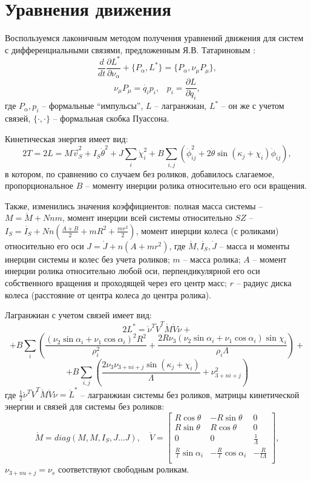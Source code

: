 \section{Уравнения движения}

Воспользуемся лаконичным методом получения уравнений движения для систем с дифференциальными связями, предложенным Я.В. Татариновым \cite{Tatarinov}:
\begin{equation}\label{Tatarinov}
    \frac{d}{dt}\frac{\partial L^{*}}{\partial \nu_\alpha}  + \{P_\alpha, L^{*}\} = \{P_\alpha, \nu_\mu P_\mu\}, 
\end{equation}
$$\nu_\mu P_\mu = \dot{q_i} p_i, \hspace{10pt} p_i = \frac{\partial L}{\partial \dot{q}_i},$$
где $P_\alpha, p_i$ -- формальные ``импульсы'', $L$ -- лагранжиан, $L^*$ -- он же с учетом связей, $\{\cdot, \cdot\}$ -- формальная скобка Пуассона.

Кинетическая энергия имеет вид:
\begin{equation}\label{kin_en}
    2T = 2L = M\vec{v}_S^2 + I_S\dot{\theta}^2 + J\sum_i\dot{\chi}_i^2 + B\sum_{i,j}(\dot{\phi}_{ij}^2 + 2\dot{\theta}\sin(\kappa_j + \chi_i)\dot{\phi}_{ij}),
\end{equation}
в котором, по сравнению со случаем без роликов, добавилось слагаемое, пропорциональное $B$ -- моменту инерции ролика относительно его оси вращения.

Также, изменились значения коэффициентов: полная масса системы -- $M = \mathring{M} + Nnm$, момент инерции всей системы относительно $SZ$ -- $I_S = \mathring{I_S} + Nn(\frac{A+B}{2} + mR^2 + \frac{mr^2}{2})$, момент инерции колеса (с роликами) относительно его оси $J = \mathring{J} + n(A + mr^2)$, где $\mathring{M}, \mathring{I_S}, \mathring{J}$ -- масса и моменты инерции системы и колес без учета роликов; $m$ -- масса ролика; $A$ -- момент инерции ролика относительно любой оси, перпендикулярной его оси собственного вращения и проходящей через его центр масс; $r$ -- радиус диска колеса (расстояние от центра колеса до центра ролика).

Лагранжиан с учетом связей имеет вид:
$$ 2L^{*} = \mathring{\nu}^T \mathring{V}^T \mathring{M} \mathring{V} \mathring{\nu} + $$
$$ + B\sum_{i}(
	\frac{(\nu_2\sin\alpha_i+\nu_1\cos\alpha_i)^2R^2}
	{\rho_i^2} +
	\frac{2R\nu_3(\nu_2\sin\alpha_i+\nu_1\cos\alpha_i)\sin\chi_i}
	{\rho_i\Lambda}
) + $$
$$+ B\sum_{i,j}(
	\frac{2\nu_3\nu_{3+ni+j}\sin(\kappa_j+\chi_i)}
	{\Lambda}
	+
	\nu_{3+ni+j}^2
)
$$
где $\frac{1}{2}\mathring{\nu}^T \mathring{V}^T \mathring{M} \mathring{V} \mathring{\nu} = \mathring{L}^{*}$ -- лагранжиан системы без роликов, матрицы кинетической энергии и связей для системы без роликов:
$$
\mathring{M} = diag(M, M, I_S, J...J),
\quad
\mathring{V} = \begin{bmatrix}
    R\cos\theta & -R\sin\theta & 0 \\
    R\sin\theta & R\cos\theta  & 0 \\
    0           & 0            & \frac{1}{\Lambda} \\
    \frac{R}{l}\sin\alpha_i & -\frac{R}{l}\cos\alpha_i & -\frac{R}{l\Lambda} \\
\end{bmatrix},
$$
$\nu_{3+nu+j} = \nu_s$ соответствуют свободным роликам.

